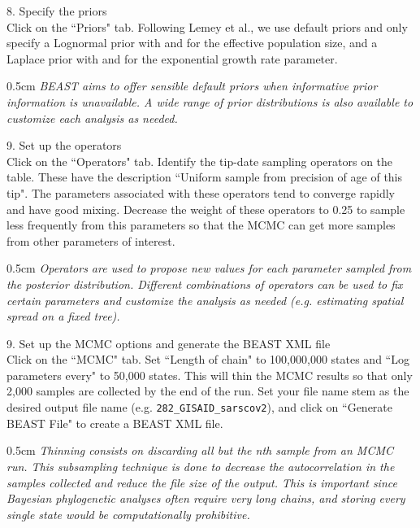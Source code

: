 \documentclass{article}
\newcommand{\ann}[1]{
\begin{adjustwidth}{0.5cm}{}
\it{#1}\\
\end{adjustwidth}}
\newcommand{\code}[1]{
{\upshape\ttfamily{#1}}}
\begin{document}
8. Specify the priors \\

Click on the ``Priors" tab. Following Lemey et al., we use default priors and only specify a Lognormal prior with \code{mu=0} and \code{sigma=10} for the effective population size, and a Laplace prior with \code{mean=0} and \code{scale=100} for the exponential growth rate parameter.\\

\ann{BEAST aims to offer sensible default priors when informative prior information is unavailable. A wide range of prior distributions is also available to customize each analysis as needed.}

9. Set up the operators \\

Click on the ``Operators" tab. Identify the tip-date sampling operators on the table. These have the description ``Uniform sample from precision of age of this tip". The parameters associated with these operators tend to converge rapidly and have good mixing. Decrease the weight of these operators to 0.25 to sample less frequently from this parameters so that the MCMC can get more samples from other parameters of interest.\\

\ann{Operators are used to propose new values for each parameter sampled from the posterior distribution. Different combinations of operators can be used to fix certain parameters and customize the analysis as needed (e.g. estimating spatial spread on a fixed tree).}

9. Set up the MCMC options and generate the BEAST XML file\\

Click on the ``MCMC" tab. Set ``Length of chain" to 100,000,000 states and ``Log parameters every" to 50,000 states. This will thin the MCMC results so that only 2,000 samples are collected by the end of the run. Set your file name stem as the desired output file name (e.g. \texttt{282\_GISAID\_sarscov2}), and click on ``Generate BEAST File" to create a BEAST XML file.\\

\ann{Thinning consists on discarding all but the nth sample from an MCMC run. This subsampling technique is done to decrease the autocorrelation in the samples collected and reduce the file size of the output. This is important since Bayesian phylogenetic analyses often require very long chains, and storing every single state would be computationally prohibitive.}
\end{document}
